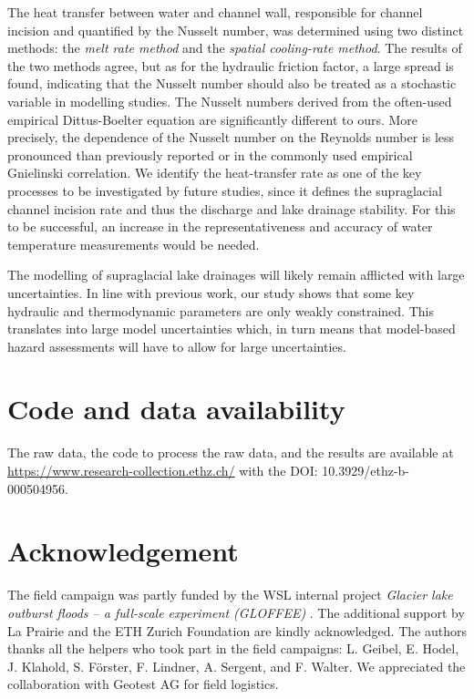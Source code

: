 The heat transfer between water and channel wall, responsible for channel incision and quantified by the Nusselt number, was determined using two distinct methods: the \textit{melt rate method} and the \textit{spatial cooling-rate method}. The results of the two methods agree, but as for the hydraulic friction factor, a large spread is found, indicating that the Nusselt number should also be treated as a stochastic variable in modelling studies.
%
The Nusselt numbers derived from the often-used empirical Dittus-Boelter equation are significantly different to ours. More precisely, the dependence of the Nusselt number on the Reynolds number is less pronounced than previously reported \citep[e.g.][]{Clarke2003,Lunardini&al1986, Vincent&al2010} or in the commonly used empirical Gnielinski correlation.
%
We identify the heat-transfer rate as one of the key processes to be investigated by future studies, since it defines the supraglacial channel incision rate and thus the discharge and lake drainage stability. For this to be successful, an increase in the representativeness and accuracy of water temperature measurements would be needed.

The modelling of supraglacial lake drainages will likely remain afflicted with large uncertainties. In line with previous work, our study shows that some key hydraulic and thermodynamic parameters are only weakly constrained. This translates into large model uncertainties which, in turn means that model-based hazard assessments will have to allow for large uncertainties.

\section{Code and data availability}

The raw data, the code to process the raw data, and the results are available at \url{https://www.research-collection.ethz.ch/} with the DOI: 10.3929/ethz-b-000504956.

\section{Acknowledgement}

The field campaign was partly funded by the WSL internal project \textit{Glacier lake outburst floods – a full-scale experiment (GLOFFEE)} . The additional support by La Prairie and the ETH Zurich Foundation are kindly acknowledged. The authors thanks all the helpers who took part in the field campaigns: L. Geibel, E. Hodel, J. Klahold, S. Förster, F. Lindner, A. Sergent, and F. Walter. We appreciated the collaboration with Geotest AG for field logistics.

